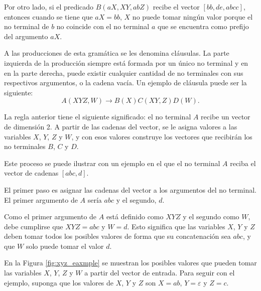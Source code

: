 \documentclass[12pt]{article}
\begin{document}
Por otro lado, si el predicado $B(aX, XY, abZ)$ recibe el vector $[bb,de,abcc]$, entonces cuando se tiene que $aX=bb$,
$X$ no puede tomar ningún valor porque el no terminal de $b$ no coincide con el no terminal $a$ que se encuentra como 
prefijo del argumento $aX$.

A las producciones de esta gramática se les denomina cláusulas. La parte izquierda de la producción 
siempre está formada por un único no terminal y en en la parte derecha, puede existir cualquier cantidad de no terminales 
con sus respectivos argumentos, o la cadena vacía. Un ejemplo de cláusula puede ser la siguiente:
$$A(XYZ,W)\to B(X)C(XY,Z)D(W).$$

La regla anterior tiene el siguiente significado: el no terminal $A$ recibe un vector de dimensión 2. A partir 
de las cadenas del vector, se le asigna valores a las variables $X$, $Y$, $Z$ y $W$, y con esos valores 
construye los vectores que recibirán los no terminales $B$, $C$ y $D$.

Este proceso se puede ilustrar con un ejemplo en el que el no terminal $A$ reciba el vector de cadenas $[abc, d]$.

El primer paso es asignar las cadenas del vector a los argumentos del no terminal. El primer argumento de $A$ sería $abc$ y el segundo, $d$.

Como el primer argumento de $A$ está definido como $XYZ$ y el segundo como $W$, debe cumplirse que $XYZ=abc$ y $W=d$. Esto significa que las variables $X$, $Y$ y $Z$ deben tomar todos los posibles valores de forma que su concatenación sea $abc$, y que $W$ solo puede tomar el valor $d$.

En la Figura \ref{fig:xyz_eaxmple} se muestran los posibles valores que pueden tomar las variables $X$, $Y$, $Z$ y $W$ a partir del vector de entrada. Para seguir con el ejemplo, suponga que los valores de $X$, $Y$ y $Z$ son $X=ab$, $Y=\varepsilon$ y $Z=c$.
\end{document}
